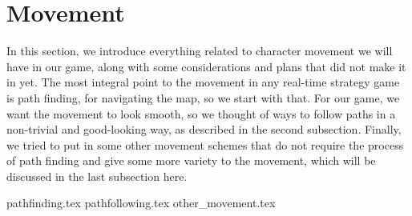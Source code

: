 \section{Movement}
In this section, we introduce everything related to character movement we will have in our game, along with some considerations and plans that did not make it in yet. The most integral point to the movement in any real-time strategy game is path finding, for navigating the map, so we start with that. For our game, we want the movement to look smooth, so we thought of ways to follow paths in a non-trivial and good-looking way, as described in the second subsection. Finally, we tried to put in some other movement schemes that do not require the process of path finding and give some more variety to the movement, which will be discussed in the last subsection here.

{pathfinding.tex}
{pathfollowing.tex}
{other_movement.tex}
